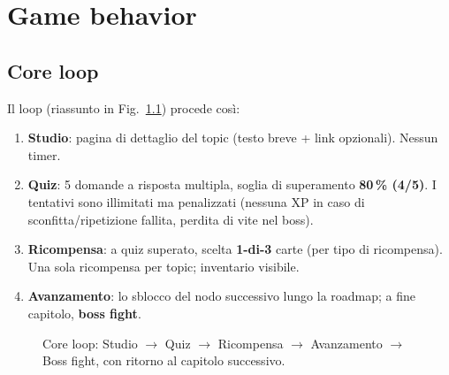 \chapter{Game behavior}
\label{g:behavior}

\section{Core loop}
Il loop (riassunto in Fig.~\ref{fig:coreloop}) procede cos\`i:
\begin{enumerate}
\item \textbf{Studio}: pagina di dettaglio del topic (testo breve + link
opzionali). Nessun timer.
\item \textbf{Quiz}: 5 domande a risposta multipla, soglia di superamento
\textbf{80\,\% (4/5)}. I tentativi sono illimitati ma penalizzati (nessuna
XP in caso di sconfitta/ripetizione fallita, perdita di vite nel boss).
\item \textbf{Ricompensa}: a quiz superato, scelta \textbf{1-di-3} carte
(per tipo di ricompensa). Una sola ricompensa per topic; inventario visibile.
\item \textbf{Avanzamento}: lo sblocco del nodo successivo lungo la roadmap;
a fine capitolo, \textbf{boss fight}.
\end{enumerate}

\begin{figure}[ht]
\centering
{}
\caption{Core loop: Studio $\rightarrow$ Quiz $\rightarrow$ Ricompensa $\rightarrow$ Avanzamento $\rightarrow$ Boss fight, con ritorno al capitolo successivo.}
\label{fig:coreloop}
\end{figure}

